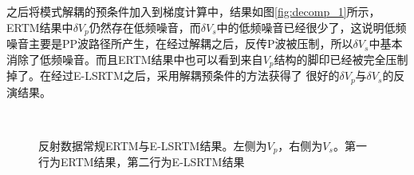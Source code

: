 之后将模式解耦的预条件加入到梯度计算中，结果如图\ref{fig:decomp_1}所示，ERTM结果中$\delta
V_p$仍然存在低频噪音，而$\delta
V_s$中的低频噪音已经很少了，这说明低频噪音主要是PP波路径所产生，在经过解耦之后，反传P波被压制，所以$\delta
V_s$中基本消除了低频噪音。而且ERTM结果中也可以看到来自$V_p$结构的脚印已经被完全压制掉了。在经过E-LSRTM之后，采用解耦预条件的方法获得了
很好的$\delta V_p$与$\delta V_s$的反演结果。
\begin{figure}[!htb]
   \centering
   \\
   \caption{反射数据常规ERTM与E-LSRTM结果。左侧为$V_p$，右侧为$V_s$。第一行为ERTM结果，第二行为E-LSRTM结果}
   \label{fig:RTM_1_refl}
\end{figure}

